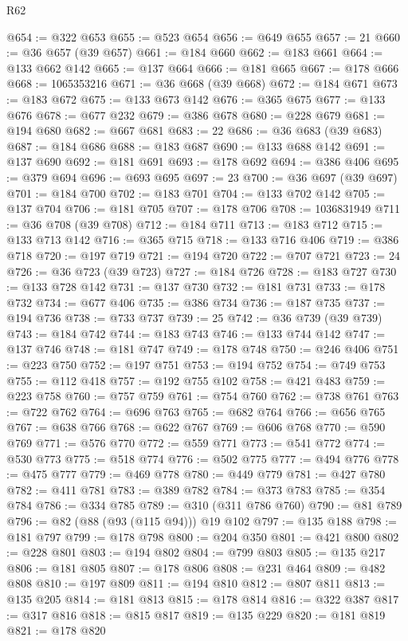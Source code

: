 \begin{lexlean}{R62}
\begin{coremodule}
@654 := @322 @653
@655 := @523 @654
@656 := @649 @655
@657 := 21
@660 := @36 @657 (@39 @657)
@661 := @184 @660
@662 := @183 @661
@664 := @133 @662 @142
@665 := @137 @664
@666 := @181 @665
@667 := @178 @666
@668 := 1065353216
@671 := @36 @668 (@39 @668)
@672 := @184 @671
@673 := @183 @672
@675 := @133 @673 @142
@676 := @365 @675
@677 := @133 @676
@678 := @677 @232
@679 := @386 @678
@680 := @228 @679
@681 := @194 @680
@682 := @667 @681
@683 := 22
@686 := @36 @683 (@39 @683)
@687 := @184 @686
@688 := @183 @687
@690 := @133 @688 @142
@691 := @137 @690
@692 := @181 @691
@693 := @178 @692
@694 := @386 @406
@695 := @379 @694
@696 := @693 @695
@697 := 23
@700 := @36 @697 (@39 @697)
@701 := @184 @700
@702 := @183 @701
@704 := @133 @702 @142
@705 := @137 @704
@706 := @181 @705
@707 := @178 @706
@708 := 1036831949
@711 := @36 @708 (@39 @708)
@712 := @184 @711
@713 := @183 @712
@715 := @133 @713 @142
@716 := @365 @715
@718 := @133 @716 @406
@719 := @386 @718
@720 := @197 @719
@721 := @194 @720
@722 := @707 @721
@723 := 24
@726 := @36 @723 (@39 @723)
@727 := @184 @726
@728 := @183 @727
@730 := @133 @728 @142
@731 := @137 @730
@732 := @181 @731
@733 := @178 @732
@734 := @677 @406
@735 := @386 @734
@736 := @187 @735
@737 := @194 @736
@738 := @733 @737
@739 := 25
@742 := @36 @739 (@39 @739)
@743 := @184 @742
@744 := @183 @743
@746 := @133 @744 @142
@747 := @137 @746
@748 := @181 @747
@749 := @178 @748
@750 := @246 @406
@751 := @223 @750
@752 := @197 @751
@753 := @194 @752
@754 := @749 @753
@755 := @112 @418
@757 := @192 @755 @102
@758 := @421 @483
@759 := @223 @758
@760 := @757 @759
@761 := @754 @760
@762 := @738 @761
@763 := @722 @762
@764 := @696 @763
@765 := @682 @764
@766 := @656 @765
@767 := @638 @766
@768 := @622 @767
@769 := @606 @768
@770 := @590 @769
@771 := @576 @770
@772 := @559 @771
@773 := @541 @772
@774 := @530 @773
@775 := @518 @774
@776 := @502 @775
@777 := @494 @776
@778 := @475 @777
@779 := @469 @778
@780 := @449 @779
@781 := @427 @780
@782 := @411 @781
@783 := @389 @782
@784 := @373 @783
@785 := @354 @784
@786 := @334 @785
@789 := @310 (@311 @786 @760)
@790 := @81 @789
@796 := @82 (@88 (@93 (@115 @94))) @19 @102
@797 := @135 @188
@798 := @181 @797
@799 := @178 @798
@800 := @204 @350
@801 := @421 @800
@802 := @228 @801
@803 := @194 @802
@804 := @799 @803
@805 := @135 @217
@806 := @181 @805
@807 := @178 @806
@808 := @231 @464
@809 := @482 @808
@810 := @197 @809
@811 := @194 @810
@812 := @807 @811
@813 := @135 @205
@814 := @181 @813
@815 := @178 @814
@816 := @322 @387
@817 := @317 @816
@818 := @815 @817
@819 := @135 @229
@820 := @181 @819
@821 := @178 @820

\end{coremodule}
\end{lexlean}
